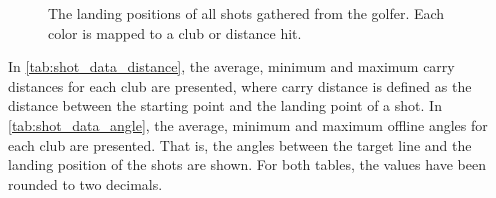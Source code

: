 \documentclass{kththesis}
\begin{document}
\begin{figure}
    \caption{The landing positions of all shots gathered from the golfer. Each color is mapped to a club or distance hit.}
    \label{fig:all_shots}
\end{figure}

In \autoref{tab:shot_data_distance}, the average, minimum and maximum carry distances for each club are presented, where carry distance is defined as the distance between the starting point and the landing point of a shot. In \autoref{tab:shot_data_angle}, the average, minimum and maximum offline angles for each club are presented. That is, the angles between the target line and the landing position of the shots are shown. For both tables, the values have been rounded to two decimals.

\begin{table}
\centering
{}
\caption{The average, minimum and maximum carry distances for each club and distance hit by the golfer. All numbers are rounded to two decimals.}
\label{tab:shot_data_distance}
\end{table}
\end{document}
